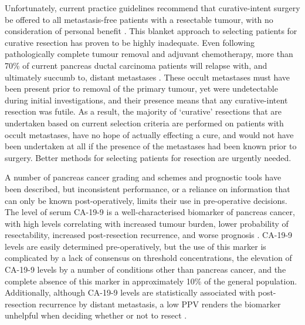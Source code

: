 \documentclass[dissertation.tex]{subfiles}
\begin{document}
Unfortunately, current practice guidelines recommend that curative-intent surgery be offered to all metastasis-free patients with a resectable tumour, with no consideration of personal benefit \cite{Editors2015}.  This blanket approach to selecting patients for curative resection has proven to be highly inadequate.  Even following pathologically complete tumour removal and adjuvant chemotherapy, more than 70\% of current pancreas ductal carcinoma patients will relapse with, and ultimately succumb to, distant metastases \cite{Barugola2007}.  These occult metastases must have been present prior to removal of the primary tumour, yet were undetectable during initial investigations, and their presence means that any curative-intent resection was futile.  As a result, the majority of `curative' resections that are undertaken based on current selection criteria are performed on patients with occult metastases, have no hope of actually effecting a cure, and would not have been undertaken at all if the presence of the metastases had been known prior to surgery.  Better methods for selecting patients for resection are urgently needed.

A number of pancreas cancer grading and schemes and prognostic tools have been described, but inconsistent performance, or a reliance on information that can only be known post-operatively, limits their use in pre-operative decisions.  The level of serum \gls{CA-19-9} is a well-characterised biomarker of pancreas cancer, with high levels correlating with increased tumour burden, lower probability of resectability, increased post-resection recurrence, and worse prognosis \cite{Kim2011, Ballehaninna2012, Barugola2007, Lundin1994}.  \Gls{CA-19-9} levels are easily determined pre-operatively, but the use of this marker is complicated by a lack of consensus on threshold concentrations, the elevation of \gls{CA-19-9} levels by a number of conditions other than pancreas cancer, and the complete absence of this marker in approximately 10\% of the general population.  Additionally, although \gls{CA-19-9} levels are statistically associated with post-resection recurrence by distant metastasis, a low \gls{PPV} renders the biomarker unhelpful when deciding whether or not to resect \cite{Kim2011}.
\end{document}
